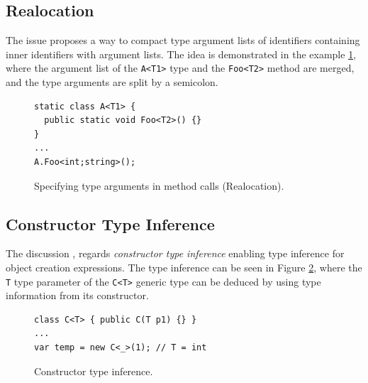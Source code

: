 \subsection{Realocation} \label{sect13:is8}

The issue \cite{online:Realloc} proposes a way to compact type argument lists of identifiers containing inner identifiers with argument lists. 
The idea is demonstrated in the example \ref{img25:Realloc}, where the argument list of the \texttt{A<T1>} type and the \texttt{Foo<T2>} method are merged, and the type arguments are split by a semicolon.
\begin{figure}[h]
\begin{lstlisting}[style=csharp]
static class A<T1> {
  public static void Foo<T2>() {}
}
...
A.Foo<int;string>();
\end{lstlisting}
\caption{Specifying type arguments in method calls (Realocation).}
\label{img25:Realloc}
\end{figure}

\subsection{Constructor Type Inference} \label{sect14:is9}

The discussion \cite{online:CtorTInf}, regards \textit{constructor type inference} enabling type inference for object creation expressions. 
The type inference can be seen in Figure \ref{img26:CtorTInf}, where the \texttt{T} type parameter of the \texttt{C<T>} generic type can be deduced by using type information from its constructor.
\begin{figure}[h!]
\begin{lstlisting}[style=csharp]
class C<T> { public C(T p1) {} }
...
var temp = new C<_>(1); // T = int
\end{lstlisting}
\caption{Constructor type inference.}
\label{img26:CtorTInf}
\end{figure}
